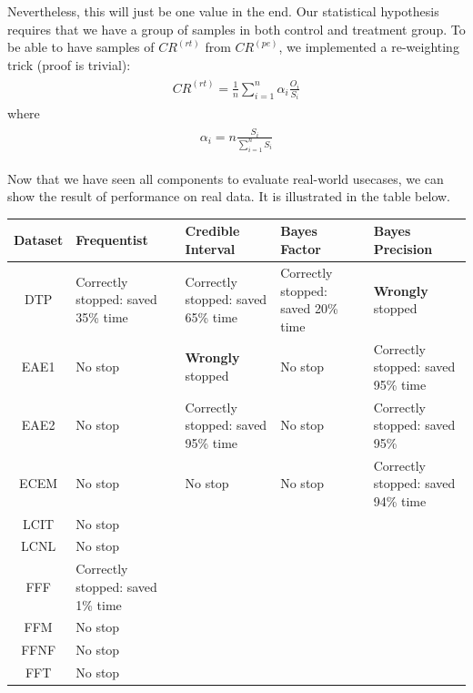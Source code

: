 \documentclass[paper=a4, fontsize=11pt]{scrartcl} %
\numberwithin{equation}{section} %
\numberwithin{figure}{section} %
\numberwithin{table}{section} %
\begin{document}
Nevertheless, this will just be one value in the end. Our statistical hypothesis requires that we have a group of samples in both control and treatment group.
To be able to have samples of $CR^{(rt)}$ from $CR^{(pe)}$, we implemented a re-weighting trick (proof is trivial):
\begin{align} 
\begin{split}
CR^{(rt)} = \frac{1}{n} \sum_{i=1}^{n} \alpha_i \frac{O_i}{S_i}
\end{split}					
\end{align}
where
\begin{align} 
\begin{split}
\alpha_i  = n \frac{S_i}{\sum_{i=1}^{n} S_i}
\end{split}					
\end{align}

Now that we have seen all components to evaluate real-world usecases, we can show the result of performance on real data. It is illustrated in the table below.

\begin{center}
  \begin{tabular}{ | c | p{30mm} | p{30mm} | p{30mm} | p{30mm} |}
    \hline
     Dataset & Frequentist  & Credible Interval & Bayes Factor & Bayes Precision \\ \hline\hline
     DTP & Correctly stopped: saved 35\% time & Correctly stopped: saved 65\% time & Correctly stopped: saved 20\% time & \textbf{Wrongly} stopped \\ \hline
     EAE1 & No stop & \textbf{Wrongly} stopped & No stop & Correctly stopped: saved 95\% time \\ \hline
     EAE2 & No stop & Correctly stopped: saved 95\% time & No stop & Correctly stopped: saved 95\% \\ \hline
     ECEM & No stop & No stop & No stop & Correctly stopped: saved 94\% time \\ \hline
     LCIT & No stop & & & \\ \hline
     LCNL & No stop & & & \\ \hline
     FFF & Correctly stopped: saved 1\% time & & & \\ \hline
     FFM & No stop & & & \\ \hline
     FFNF & No stop & & & \\ \hline
     FFT & No stop & & & \\ \hline
  \end{tabular}
\end{center}
\end{document}
